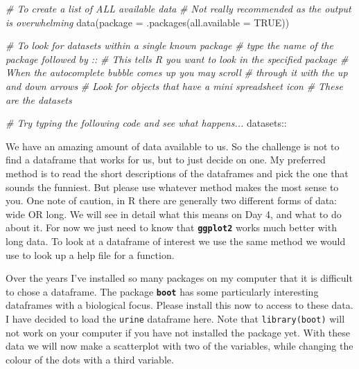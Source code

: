 \documentclass[
]{book}
\newenvironment{Shaded}{\begin{snugshade}}{\end{snugshade}}
\newcommand{\AttributeTok}[1]{\textcolor[rgb]{0.77,0.63,0.00}{#1}}
\newcommand{\CommentTok}[1]{\textcolor[rgb]{0.56,0.35,0.01}{\textit{#1}}}
\newcommand{\ConstantTok}[1]{\textcolor[rgb]{0.00,0.00,0.00}{#1}}
\newcommand{\FunctionTok}[1]{\textcolor[rgb]{0.00,0.00,0.00}{#1}}
\newcommand{\NormalTok}[1]{#1}
\newcommand{\SpecialCharTok}[1]{\textcolor[rgb]{0.00,0.00,0.00}{#1}}
\begin{document}
\begin{Shaded}
\begin{Highlighting}[]
\CommentTok{\# To create a list of ALL available data}
  \CommentTok{\# Not really recommended as the output is overwhelming}
\FunctionTok{data}\NormalTok{(}\AttributeTok{package =} \FunctionTok{.packages}\NormalTok{(}\AttributeTok{all.available =} \ConstantTok{TRUE}\NormalTok{))}

\CommentTok{\# To look for datasets within a single known package}
  \CommentTok{\# type the name of the package followed by \textquotesingle{}::\textquotesingle{}}
  \CommentTok{\# This tells R you want to look in the specified package}
  \CommentTok{\# When the autocomplete bubble comes up you may scroll}
  \CommentTok{\# through it with the up and down arrows}
  \CommentTok{\# Look for objects that have a mini spreadsheet icon}
  \CommentTok{\# These are the datasets}

\CommentTok{\# Try typing the following code and see what happens...}
\NormalTok{datasets}\SpecialCharTok{::}
\end{Highlighting}
\end{Shaded}

We have an amazing amount of data available to us. So the challenge is not to find a dataframe that works for us, but to just decide on one. My preferred method is to read the short descriptions of the dataframes and pick the one that sounds the funniest. But please use whatever method makes the most sense to you. One note of caution, in R there are generally two different forms of data: wide OR long. We will see in detail what this means on Day 4, and what to do about it. For now we just need to know that \textbf{\texttt{ggplot2}} works much better with long data. To look at a dataframe of interest we use the same method we would use to look up a help file for a function.

Over the years I've installed so many packages on my computer that it is difficult to chose a dataframe. The package \textbf{\texttt{boot}} has some particularly interesting dataframes with a biological focus. Please install this now to access to these data. I have decided to load the \texttt{urine} dataframe here. Note that \texttt{library(boot)} will not work on your computer if you have not installed the package yet. With these data we will now make a scatterplot with two of the variables, while changing the colour of the dots with a third variable.
\end{document}
